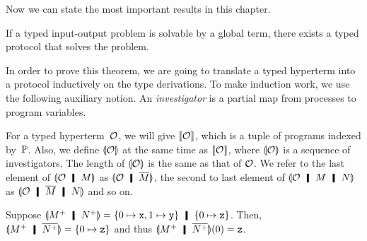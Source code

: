  Now we can state the most important results in this chapter.
\begin{theorem}
 \label{th:soundness}
 If a typed input-output problem is solvable by a global term,
 there exists a typed protocol that solves the problem.
\end{theorem}

In order to prove this theorem,
we are going to translate a typed hyperterm into a protocol inductively
on the type derivations.
To make induction work, we use the following auxiliary notion.
An \textit{investigator} is a partial map from processes
to program variables.

For a typed
hyperterm~$\mathcal{O}$,
we will give $\llbracket{\mathcal{O}}\rrbracket$, which is a tuple of programs indexed
by~$\mathbb{P}$.
Also, we define $\llparenthesis{\mathcal{O}}\rrparenthesis$ at the same time as
$\llbracket{\mathcal{O}}\rrbracket$, where
$\llparenthesis{\mathcal{O}}\rrparenthesis$ is a sequence of investigators.  The length of
$\llparenthesis{\mathcal{O}}\rrparenthesis$ is the same as that of $\mathcal{O}$.
We refer to the last element of $\semoi{\hypert\hmid M}$ as
$\semoi{\hypert\hmid \overline{M}}$, the second to last element of
$\semoi{\hypert\hmid M\hmid N}$ as
$\semoi{\hypert\hmid \overline M\hmid N}$ and so on.
 \begin{example}
Suppose $\semoi{\m{M}\hmid \m{N}} = \{0\mapsto \p x, 1\mapsto \p
  y\}\hmid \{0\mapsto \p z\}$.
  Then,
  $\semoi{\m{M}\hmid \overline{\m{N}}} = \{0\mapsto\p z\}$ and thus
  $\semoi{\m{M}\hmid \overline{\m{N}}}(0) = \p z$.
 \end{example}

